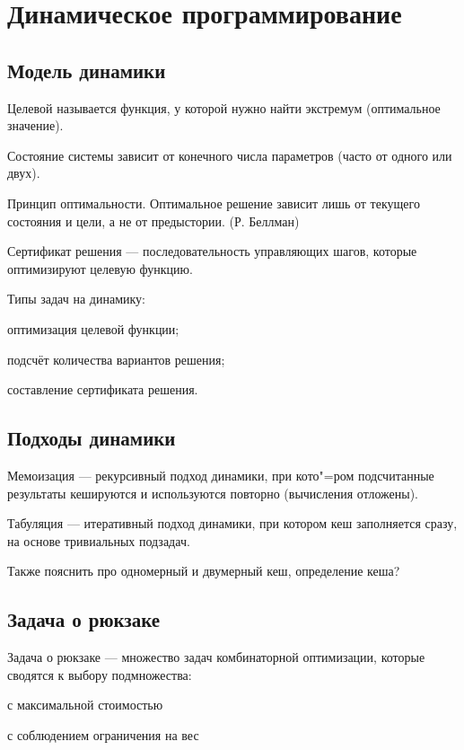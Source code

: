 \section{Динамическое программирование}

\subsection{Модель динамики}

{\bold Целевой} называется функция, у которой нужно найти {\ital экстремум {\color{desc}(оптимальное значение)}}.

{\bold Состояние} системы зависит от конечного числа {\ital параметров {\color{desc} (часто от одного или двух)}}.
\begin{theorem}
{\bold Принцип оптимальности}. Оптимальное решение зависит лишь от текущего состояния и цели, а не от предыстории. {\ital\color{desc}(Р. Беллман)}
\end{theorem}
{\bold Сертификат} {\ital решения} --- последовательность управляющих шагов, которые оптимизируют целевую функцию.

{\ital Типы} задач на динамику:

\begin{list*}
\item оптимизация целевой функции;
\item подсчёт количества вариантов решения;
\item составление сертификата решения.
\end{list*}

\subsection{Подходы динамики}

{\bold Мемоизация} --- {\ital рекурсивный} подход динамики, при кото"=ром подсчитанные результаты {\ital кешируются} и используются повторно {\ital\color{desc}(вычисления отложены)}.

{\bold Табуляция} --- {\ital итеративный} подход динамики, при котором кеш заполняется сразу, на основе тривиальных подзадач.

Также пояснить про одномерный и двумерный кеш, определение кеша?

\newpage
\subsection{Задача о рюкзаке}

{\bold Задача о рюкзаке} --- множество задач {\ital комбинаторной оптимизации}, которые сводятся к выбору подмножества:
\begin{list*}
\item с максимальной {\ital стоимостью}
\item с соблюдением ограничения на {\ital вес}
\end{list*}


